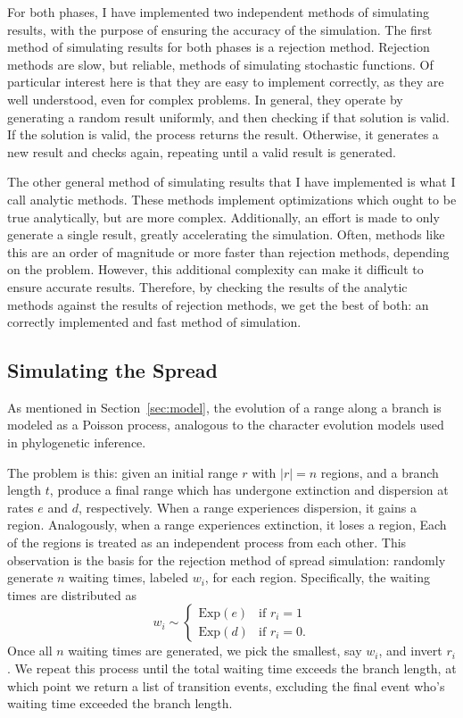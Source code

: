 \documentclass{article}
\begin{document}
For both phases, I have implemented two independent methods of simulating
results, with the purpose of ensuring the accuracy of the simulation.
The first method of simulating results for both phases is a rejection method.
Rejection methods are slow, but reliable, methods of simulating stochastic
functions.
Of particular interest here is that they are easy to implement correctly, as
they are well understood, even for complex problems.
In general, they operate by generating a random result uniformly, and then
checking if that solution is valid.
If the solution is valid, the process returns the result.
Otherwise, it generates a new result and checks again, repeating until a valid
result is generated.

The other general method of simulating results that I have implemented is what
I call analytic methods.
These methods implement optimizations which ought to be true analytically, but
are more complex.
Additionally, an effort is made to only generate a single result, greatly
accelerating the simulation.
Often, methods like this are an order of magnitude or more faster than
rejection methods, depending on the problem.
However, this additional complexity can make it difficult to ensure accurate
results.
Therefore, by checking the results of the analytic methods against the results
of rejection methods, we get the best of both: an correctly implemented and
fast method of simulation.

\subsection{Simulating the Spread}

As mentioned in Section~\ref{sec:model}, the evolution of a range along a
branch is modeled as a Poisson process, analogous to the character evolution
models used in phylogenetic inference.

The problem is this: given an initial range \( r \) with \( |r| = n \) regions,
and a branch length \( t \), produce a final range which has undergone
extinction and dispersion at rates \( e \) and \( d \), respectively.
When a range experiences dispersion, it gains a region.
Analogously, when a range experiences extinction, it loses a region, Each of
the regions is treated as an independent process from each other.
This observation is the basis for the rejection method of spread simulation:
randomly generate \( n \) waiting times, labeled \( w_i \), for each region.
Specifically, the waiting times are distributed as
\begin{equation}
  \label{eq:exp-rejection} w_i \sim
  \begin{cases}
    \text{Exp}(e) & \text{if } r_i
    = 1                            \\ \text{Exp}(d) & \text{if } r_i = 0.
  \end{cases}
\end{equation}
Once all $n$ waiting times are generated, we pick the smallest, say $w_i$, and
invert $r_i$.
We repeat this process until the total waiting time exceeds the branch length,
at which point we return a list of transition events, excluding the final event
who's waiting time exceeded the branch length.
\end{document}
